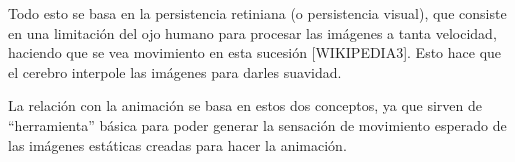 \documentclass{article}
\begin{document}
\bigskip

Todo esto se basa en la persistencia retiniana (o persistencia visual), que consiste en una limitación del ojo humano para procesar las imágenes a tanta velocidad, haciendo que se vea movimiento en esta sucesión [WIKIPEDIA3]. Esto hace que el cerebro interpole las imágenes para darles suavidad.

\bigskip

La relación con la animación se basa en estos dos conceptos, ya que sirven de ``herramienta'' básica para poder generar la sensación de movimiento esperado de las imágenes estáticas creadas para hacer la animación. 
\end{document}
